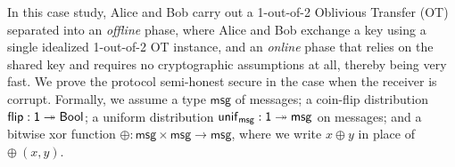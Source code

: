 \renewcommand{\msg}{\mathsf{msg}}
\newcommand{\flip}{\mathsf{flip}}
\renewcommand{\unif}{\mathsf{unif}}
\renewcommand{\id}{\mathsf{id}}
\renewcommand{\adv}{\mathsf{adv}}
\newcommand{\sen}{\mathsf{sen}}
\newcommand{\rec}{\mathsf{rec}}
\newcommand{\ot}{\mathsf{ot}}
\newcommand{\Msg}{\mathsf{Msg}}
\renewcommand{\Out}{\mathsf{Out}}
\newcommand{\Choice}{\mathsf{Choice}}
\newcommand{\OTMsg}{\mathsf{OTMsg}}
\newcommand{\OTOut}{\mathsf{OTOut}}
\newcommand{\OTChoice}{\mathsf{OTChoice}}
\newcommand{\Flip}{\mathsf{Flip}}
\renewcommand{\Key}{\mathsf{Key}}
\newcommand{\SharedKey}{\mathsf{SharedKey}}
\newcommand{\ChoiceEnc}{\mathsf{ChoiceEnc}}
\newcommand{\MsgEnc}{\mathsf{MsgEnc}}
\newcommand{\KeyPair}{\mathsf{KeyPair}}
\newcommand{\PrivateMsg}{\mathsf{PrivateMsg}}
\renewcommand{\LeakMsgRcvd}{\mathsf{MsgRcvd}}
\newcommand{\LeakOTMsgRcvd}{\mathsf{OTMsgRcvd}}
\newcommand{\LeakChoice}{\mathsf{Choice}}
\newcommand{\LeakOTChoice}{\mathsf{OTChoice}}
\newcommand{\LeakFlip}{\mathsf{Flip}}
\newcommand{\LeakOut}{\mathsf{Out}}
\newcommand{\LeakOTOut}{\mathsf{OTOut}}
\newcommand{\LeakChoiceEnc}{\mathsf{ChoiceEnc}}
\newcommand{\LeakMsgEnc}{\mathsf{MsgEnc}}

In this case study, Alice and Bob carry out a 1-out-of-2 Oblivious Transfer (OT) separated into an \emph{offline} phase, where Alice and Bob exchange a key using a single idealized 1-out-of-2 OT instance, and an \emph{online} phase that relies on the shared key and requires no cryptographic assumptions at all, thereby being very fast. We prove the protocol semi-honest secure in the case when the receiver is corrupt. Formally, we assume a type $\msg$ of messages; a coin-flip distribution $\flip : \one \twoheadrightarrow \Bool$; a uniform distribution $\unif_\msg : \one \twoheadrightarrow \msg$ on messages; and a bitwise xor function $\oplus : \msg \times \msg \rightarrow \msg$, where we write $x \oplus y$ in place of $\oplus \ (x,y)$.

